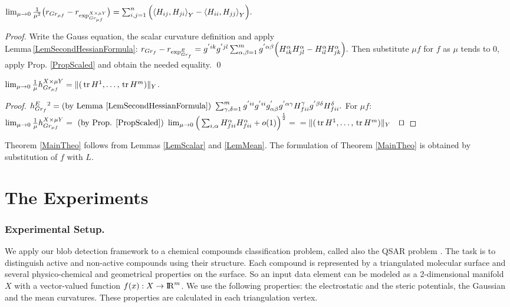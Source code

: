 \documentclass{llncs}
\newcommand {\tr}{{\,}\mathrm{tr}{\,}}
\begin{document}
\begin{lemma} \label{LemScalar}
$
\lim_{\mu\to 0} \frac{1}{{\mu}^2} \big( r_{Gr_{\mu f}} - r_{\tensor*{\exp}{^{X\times\mu Y}_ {Gr_{\mu f}} }} \big)
= \sum_{i,j=1}^{n} \Big( \langle H_{ij},H_{ji}{\rangle}_Y - \langle H_{ii},H_{jj}{\rangle}_Y \Big).
$
\end{lemma}

\begin{proof}
Write the Gauss equation, the scalar curvature definition and apply 
\\
Lemma\,\ref{LemSecondHessianFormula}: 
$r_{Gr_f} - r_{\tensor*{\exp}{^E_{Gr_{f}}}} = 
\tensor*{g}{^{'}^i^k}\tensor*{g}{^{'}^j^l}
\sum_{\alpha, \beta =1}^{m} g^{' \alpha \beta} 
\Big(\tensor*{H}{^{\alpha}_{ik}} \tensor*{H}{^{\alpha}_{jl}} - 
\tensor*{H}{^{\alpha}_{il}} \tensor*{H}{^{\alpha}_{jk}} \Big).$
Then substitute 
$\mu f$ for $f$ as $\mu$ tends to 0, apply Prop. \ref{PropScaled} and obtain the needed equality. \textrm{\qed}
\end{proof}

\begin{lemma} \label{LemMean}
$\lim_{\mu\to 0}\frac{1}{\mu} \tensor*{h}{^{X\times\mu Y}_{Gr_{\mu f}}} = \| (\tr H^1,\dots,\tr H^m )\|_Y$.
\end{lemma}

\begin{proof}
$ 
\tensor*{h}{^E_{Gr_f}} ^2 = \textrm{(by Lemma \ref{LemSecondHessianFormula}) }
\sum_{\gamma, \delta = 1}^{m} g^{'ii} g^{'ii} g^{'}_{\alpha \beta} g^{'\alpha\gamma} \tensor*{H}{_f^\gamma _i_i} g^{'\beta\delta} \tensor*{H}{_f^\delta _i_i}  .
$
For $\mu f$:
\\ 
$\lim_{\mu\to 0}\frac{1}{\mu} \tensor*{h}{^{X\times\mu Y}_{Gr_{\mu f}}} 
=\textrm{ (by Prop. \ref{PropScaled}) }
\lim_{\mu\to 0} \Big(\sum_{i, \alpha} \tensor*{H}{_f^\alpha _i_i} \tensor*{H}{_f^\alpha _i_i} + o(1) \Big)^{\frac{1}{2}} =
\\
= \| (\tr H^1,\dots,\tr H^m )\|_Y
\textrm{\qed}
$
\end{proof}

Theorem \ref{MainTheo} follows from Lemmas \ref{LemScalar} and \ref{LemMean}. The formulation of Theorem \ref{MainTheo} is obtained by substitution of $f$ with $L$.

\section{The Experiments}
\subsubsection{Experimental Setup.}
We apply our blob detection framework to a chemical compounds classification problem, called also the QSAR problem \cite{qsar}. The task is to distinguish active and non-active compounds using their structure. Each compound is represented by a triangulated molecular surface \cite{molecular} and several physico-chemical and geometrical properties on the surface. So an input data element can be modeled as a 2-dimensional manifold $X$ with a vector-valued function $f(x):X \to {\rm I\!R}^m$. We use the following properties: the electrostatic and the steric potentials, the Gaussian and the mean curvatures. These properties are calculated in each triangulation vertex.
\end{document}
